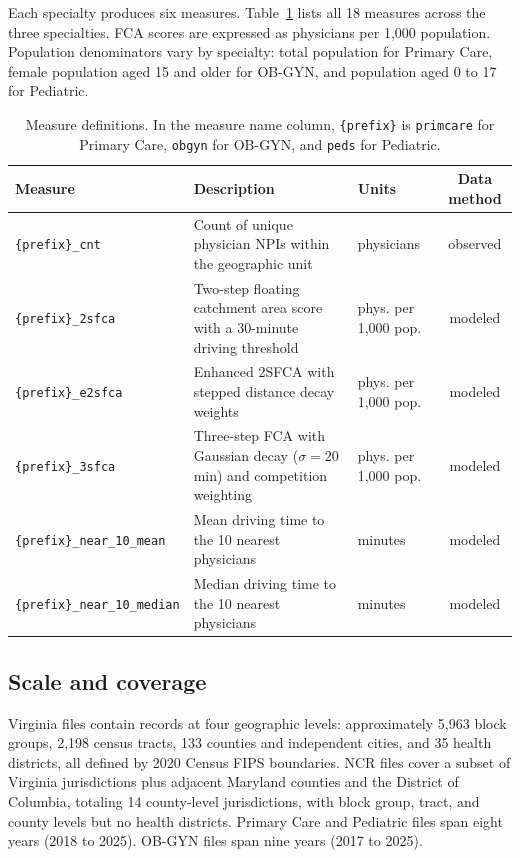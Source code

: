 \documentclass{CUP-JNL-DAP}%
\begin{document}
Each specialty produces six measures. Table~\ref{tab:measures} lists all 18 measures across the three specialties. FCA scores are expressed as physicians per 1{,}000 population. Population denominators vary by specialty: total population for Primary Care, female population aged 15 and older for OB-GYN, and population aged 0 to 17 for Pediatric.

\begin{table}[ht]
\centering
\caption{Measure definitions. In the measure name column, \texttt{\{prefix\}} is \texttt{primcare} for Primary Care, \texttt{obgyn} for OB-GYN, and \texttt{peds} for Pediatric.}
\label{tab:measures}
\small
\begin{tabularx}{\textwidth}{lXlc}
\toprule
Measure & Description & Units & Data method \\
\midrule
\texttt{\{prefix\}\_cnt} & Count of unique physician NPIs within the geographic unit & physicians & observed \\
\texttt{\{prefix\}\_2sfca} & Two-step floating catchment area score with a 30-minute driving threshold & phys. per 1{,}000 pop. & modeled \\
\texttt{\{prefix\}\_e2sfca} & Enhanced 2SFCA with stepped distance decay weights & phys. per 1{,}000 pop. & modeled \\
\texttt{\{prefix\}\_3sfca} & Three-step FCA with Gaussian decay ($\sigma = 20$ min) and competition weighting & phys. per 1{,}000 pop. & modeled \\
\texttt{\{prefix\}\_near\_10\_mean} & Mean driving time to the 10 nearest physicians & minutes & modeled \\
\texttt{\{prefix\}\_near\_10\_median} & Median driving time to the 10 nearest physicians & minutes & modeled \\
\bottomrule
\end{tabularx}
\end{table}

\subsection{Scale and coverage}

Virginia files contain records at four geographic levels: approximately 5{,}963 block groups, 2{,}198 census tracts, 133 counties and independent cities, and 35 health districts, all defined by 2020 Census FIPS boundaries. NCR files cover a subset of Virginia jurisdictions plus adjacent Maryland counties and the District of Columbia, totaling 14 county-level jurisdictions, with block group, tract, and county levels but no health districts. Primary Care and Pediatric files span eight years (2018 to 2025). OB-GYN files span nine years (2017 to 2025).
\end{document}
